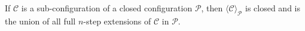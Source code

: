 If $\mathcal{C}$ is a sub-configuration of a closed configuration $\mathcal{P}$, then $\langle \mathcal{C} \rangle_{\mathcal{P}}$ is closed and is the union of all full $n$-step extensions of $\mathcal{C}$ in $\mathcal{P}$.
